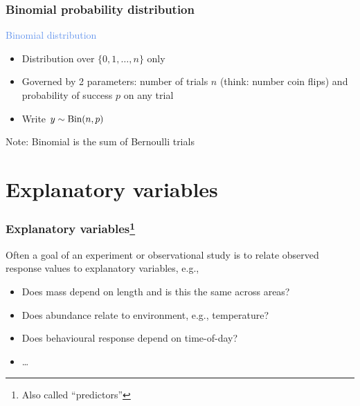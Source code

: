 \documentclass[dvipsnames]{beamer}
\begin{document}
\begin{frame}
 \frametitle{Binomial probability distribution}
 \begin{center}
 \textcolor{CornflowerBlue}{Binomial distribution}
 \end{center}

\begin{itemize}
  \item<only@2> Distribution over $\{0, 1, \dots,n\}$ only
  \item Governed by 2 parameters: number of trials $n$ (think: number coin flips) and probability of success $p$ on any trial
  \item Write $y \sim \textnormal{Bin}(n,p)$
 \end{itemize}
 Note: Binomial is the sum of Bernoulli trials
\end{frame}


\section{Explanatory variables}
\begin{frame}
 \frametitle{Explanatory variables\footnote{Also called ``predictors''}}
 Often a goal of an experiment or observational study is to relate observed response values to explanatory variables, e.g.,
 \begin{itemize}
  \item<2-> Does mass depend on length and is this the same across areas?
  \item<3-> Does abundance relate to environment, e.g., temperature?
  \item<4-> Does behavioural response depend on time-of-day?
  \item<5-> \dots
 \end{itemize}
\end{frame}
\end{document}
